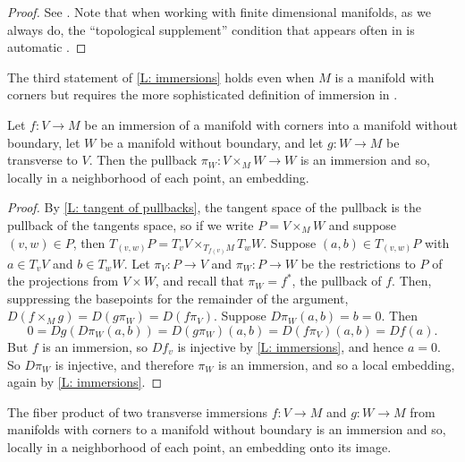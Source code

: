 \begin{proof}
	See \cite[Theorem 3.2.6, Proposition 3.2.13, and Definition 3.3.1]{MaDo92}.
	Note that when working with finite dimensional manifolds, as we always do, the ``topological supplement'' condition that appears often in \cite{MaDo92} is automatic \cite[page 7]{MaDo92}.
\end{proof}

The third statement of \cref{L: immersions} holds even when $M$ is a manifold with corners but requires the more sophisticated definition of immersion in \cite{MaDo92}.

\begin{lemma}\label{L: immersion pullback}
	Let $f \colon V \to M$ be an immersion of a manifold with corners into a manifold without boundary, let $W$ be a manifold without boundary, and let $g \colon W \to M$ be transverse to $V$.
	Then the pullback $\pi_W: V \times_M W \to W$ is an immersion and so, locally in a neighborhood of each point, an embedding.
\end{lemma}

\begin{proof}
	By \cref{L: tangent of pullbacks}, the tangent space of the pullback is the pullback of the tangents space, so if we write $P = V \times_M W$ and suppose $(v,w) \in P$, then $T_{(v,w)}P = T_vV \times_{T_{f(v)}M} T_wW$.
	Suppose $(a,b) \in T_{(v,w)}P$ with $a \in T_vV$ and $b \in T_wW$.
	Let $\pi_V \colon P \to V$ and $\pi_W \colon P \to W$ be the restrictions to $P$ of the projections from $V \times W$, and recall that $\pi_W = f^*$, the pullback of $f$.
	Then, suppressing the basepoints for the remainder of the argument, $D(f \times_M g) = D(g\pi_W) = D(f \pi_V)$.
	Suppose $D\pi_W(a,b)= b = 0$.
	Then $$0 = Dg(D\pi_W(a,b))= D(g\pi_W)(a,b) = D(f \pi_V)(a,b) = Df(a).$$
	But $f$ is an immersion, so $Df_v$ is injective by \cref{L: immersions}, and hence $a=0$.
	So $D\pi_W$ is injective, and therefore $\pi_W$ is an immersion, and so a local embedding, again by \cref{L: immersions}.
\end{proof}

\begin{lemma}
	The fiber product of two transverse immersions $f \colon V \to M$ and $g \colon W \to M$ from manifolds with corners to a manifold without boundary is an immersion and so, locally in a neighborhood of each point, an embedding onto its image.
\end{lemma}

